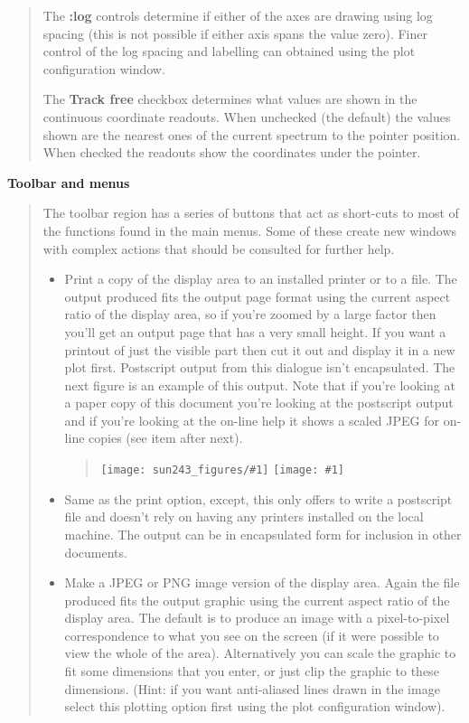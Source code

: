 \documentclass[twoside,11pt,nolof]{starlink}
\providecommand{\clippedmainfigure}[1]
{\begin{quote}
    \ifpdf
    \texttt{[image: sun243\_figures/\#1]}
    \else
    \texttt{[image: \#1]}
    \fi
 \end{quote}
}
\providecommand{\inline}[1]
        {\ifpdf
          \texttt{[image: sun243\_figures/\#1]}
          \else
          \texttt{[image: \#1]}
          \fi
        }
\newcommand{\labelitem}[1]{\textbf{#1}}
\providecommand{\subheading}[1]{\textbf{\large{#1}}}
\begin{document}
\begin{quote}
 The \labelitem{:log} controls determine if either of the axes are drawing
 using log spacing (this is not possible if either axis spans the value
 zero). Finer control of the log spacing and labelling can obtained using the
 plot configuration window.

 The \labelitem{Track free} checkbox determines what values are shown in the
 continuous coordinate readouts. When unchecked (the default) the values
 shown are the nearest ones of the current spectrum to the pointer position.
 When checked the readouts show the coordinates under the pointer.

\end{quote}

\subheading{Toolbar and menus}
\begin{quote}
 The toolbar region has a series of buttons that act as short-cuts to
 most of the functions found in the main menus. Some of these create
 new windows with complex actions that should be consulted for further
 help.

 \begin{itemize}

  \item[\inline{print}] Print a copy of the display area to an installed
  printer or to a file. The output produced fits the output page format using
  the current aspect ratio of the display area, so if you're zoomed by a large
  factor then you'll get an output page that has a very small height. If you
  want a printout of just the visible part then cut it out and display it in a
  new plot first. Postscript output from this dialogue isn't encapsulated.
  The next figure is an example of this output. Note that if you're looking at
  a paper copy of this document you're looking at the postscript output and if
  you're looking at the on-line help it shows a scaled JPEG for on-line copies
  (see item after next).

  \clippedmainfigure{printoutput}

  \item[\inline{postscriptprint}] Same as the print option, except, this only
  offers to write a postscript file and doesn't rely on having any printers
  installed on the local machine. The output can be in encapsulated form
  for inclusion in other documents.

  \item[\inline{jpegpng}] Make a JPEG or PNG image version of the display
  area. Again the file produced fits the output graphic using the current
  aspect ratio of the display area. The default is to produce an image
  with a pixel-to-pixel correspondence to what you see on the screen
  (if it were possible to view the whole of the area). Alternatively you
  can scale the graphic to fit some dimensions that you enter, or just
  clip the graphic to these dimensions. (Hint: if you want anti-aliased
  lines drawn in the image select this plotting option first using the plot
  configuration window).


\end{itemize}
\end{quote}
\end{document}
